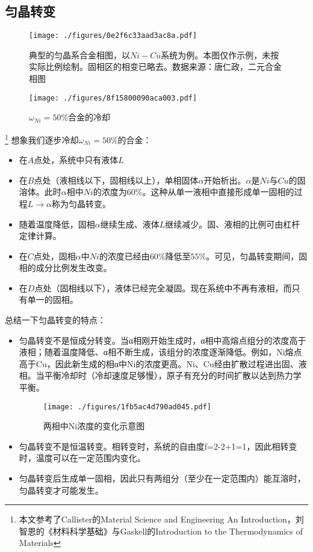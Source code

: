 

\subsection{匀晶转变}

\begin{figure}[ht]
\centering
\texttt{[image: ./figures/0e2f6c33aad3ac8a.pdf]}
\caption{典型的匀晶系合金相图，以$Ni-Cu$系统为例。本图仅作示例，未按实际比例绘制。固相区的相变已略去。数据来源：唐仁政，二元合金相图} \label{fig_ISOMOR_1}
\end{figure}

\begin{figure}[ht]
\centering
\texttt{[image: ./figures/8f15800090aca003.pdf]}
\caption{$\omega_{Ni}=50\%$合金的冷却} \label{fig_ISOMOR_3}
\end{figure}

\footnote{本文参考了Callister的Material Science and Engineering An Introduction，刘智恩的《材料科学基础》与Gaskell的Introduction to the Thermodynamics of Materials}
想象我们逐步冷却$\omega_{Ni}=50\%$的合金：
\begin{itemize}
\item 在$A$点处，系统中只有液体$L$
\item 在$B$点处（液相线以下，固相线以上），单相固体$\alpha$开始析出。$\alpha$是$Ni$与$Cu$的固溶体。此时$\alpha$相中$Ni$的浓度为$60\%$。这种从单一液相中直接形成单一固相的过程$L\to\alpha$称为匀晶转变。
\item 随着温度降低，固相$\alpha$继续生成、液体$L$继续减少。固、液相的比例可由杠杆定律计算。%
\item 在$C$点处，固相$\alpha$中$Ni$的浓度已经由$60\%$降低至$55\%$。可见，匀晶转变期间，固相的成分比例发生改变。
\item 在$D$点处（固相线以下），液体已经完全凝固。现在系统中不再有液相，而只有单一的固相。

\end{itemize}

总结一下匀晶转变的特点：
\begin{itemize}
\item 匀晶转变不是恒成分转变。当α相刚开始生成时，α相中高熔点组分的浓度高于液相；随着温度降低、α相不断生成，该组分的浓度逐渐降低。例如，Ni熔点高于Cu，因此新生成的相α中Ni的浓度更高。Ni、Cu经由扩散过程进出固、液相。当平衡冷却时（冷却速度足够慢），原子有充分的时间扩散以达到热力学平衡。

\begin{figure}[ht]
\centering
\texttt{[image: ./figures/1fb5ac4d790ad045.pdf]}
\caption{两相中Ni浓度的变化示意图} \label{fig_ISOMOR_2}
\end{figure}

\item 匀晶转变不是恒温转变。相转变时，系统的自由度f=2-2+1=1，因此相转变时，温度可以在一定范围内变化。
\item 匀晶转变后生成单一固相，因此只有两组分（至少在一定范围内）能互溶时，匀晶转变才可能发生。
\end{itemize}

